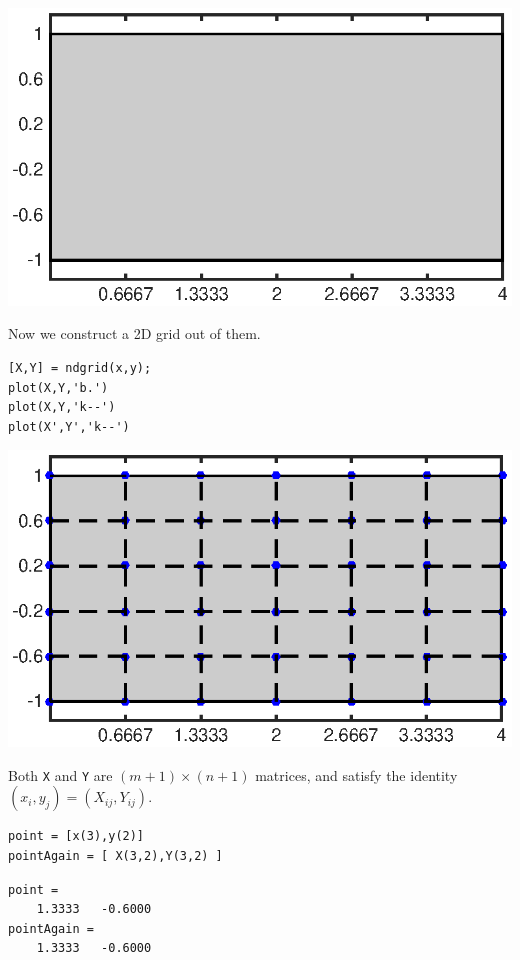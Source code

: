 \includegraphics{CubatureSetup_02.eps}
\vspace{1em}\begin{par}
Now we construct a 2D grid out of them.
\end{par} 
\begin{lstlisting}
[X,Y] = ndgrid(x,y);
plot(X,Y,'b.')
plot(X,Y,'k--')
plot(X',Y','k--')
\end{lstlisting}

\includegraphics{CubatureSetup_03.eps}
\vspace{1em}\begin{par}
Both \texttt{X} and \texttt{Y} are $(m+1)\times(n+1)$ matrices, and satisfy the identity $(x_i,y_j)=(X_{ij},Y_{ij})$.
\end{par} 
\begin{lstlisting}
point = [x(3),y(2)]
pointAgain = [ X(3,2),Y(3,2) ]
\end{lstlisting}

\color[rgb]{0.4,0,0}  \begin{lstlisting}
point =
    1.3333   -0.6000
pointAgain =
    1.3333   -0.6000

\end{lstlisting} \color{black} \vspace{1ex}
    



    
